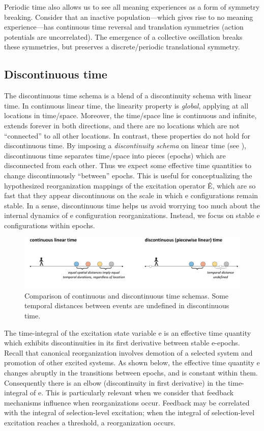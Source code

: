   Periodic time also allows us to see all meaning experiences as a form of symmetry breaking. Consider that an inactive population—which gives rise to no meaning experience—has continuous time reversal and translation symmetries (action potentials are uncorrelated). The emergence of a collective oscillation breaks these symmetries, but preserves a discrete/periodic translational symmetry.

\subsection{Discontinuous time}

The discontinuous time schema is a blend of a discontinuity schema with linear time. In continuous linear time, the linearity property is \textit{global}, applying at all locations in time/space. Moreover, the time/space line is continuous and infinite, extends forever in both directions, and there are no locations which are not “connected” to all other locations. In contrast, these properties do not hold for discontinuous time. By imposing a \textit{discontinuity schema} on linear time (see {}), discontinuous time separates time/space into pieces (epochs) which are disconnected from each other. Thus we expect some effective time quantities to change discontinuously “between” epochs. This is useful for conceptualizing the hypothesized reorganization mappings of the excitation operator Ê, which are so fast that they appear discontinuous on the scale in which e configurations remain stable. In a sense, discontinuous time helps us avoid worrying too much about the internal dynamics of e configuration reorganizations. Instead, we focus on stable e configurations within epochs.

  
\begin{figure}
\includegraphics[width=\textwidth]{figures/Tilsen-img49.png}
\caption{Comparison of continuous and discontinuous time schemas. Some temporal distances between events are undefined in discontinuous time.}
\label{fig:3:21}
\end{figure}
 

  The time-integral of the excitation state variable e is an effective time quantity which exhibits discontinuities in its first derivative between stable e-epochs. Recall that canonical reorganization involves demotion of a selected system and promotion of other excited systems. As shown below, the effective time quantity e changes abruptly in the transitions between epochs, and is constant within them. Consequently there is an elbow (discontinuity in first derivative) in the time-integral of e. This is particularly relevant when we consider that feedback mechanisms influence when reorganizations occur. Feedback may be correlated with the integral of selection-level excitation; when the integral of selection-level excitation reaches a threshold, a reorganization occurs.

